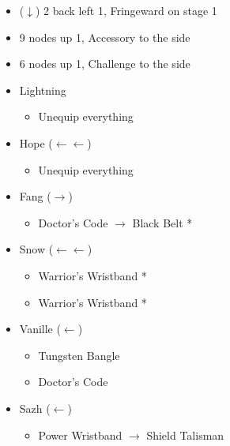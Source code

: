 \begin{menu}
\begin{itemize}
\begin{itemize}
\begin{itemize}
\begin{itemize}
						            \item ($\downarrow$) 2 back left 1, Fringeward on stage 1
						            \item 9 nodes up 1, Accessory to the side
						            \item 6 nodes up 1, Challenge to the side
					            \end{itemize}
				      \end{itemize}
			\end{itemize}
			\equip
			\begin{itemize}
				\item Lightning
				      \begin{itemize}
					      \item Unequip everything
				      \end{itemize}
				\item Hope ($\leftarrow\leftarrow$)
				      \begin{itemize}
					      \item Unequip everything
				      \end{itemize}
				\item Fang ($\rightarrow$)
					            \begin{itemize}
						            \item Doctor's Code $\rightarrow$ Black Belt *
					            \end{itemize}
				\item Snow ($\leftarrow\leftarrow$)
				      \begin{itemize}
						            \item Warrior's Wristband *
						            \item Warrior's Wristband *
					            \end{itemize}
				\item Vanille ($\leftarrow$)
				      \begin{itemize}
						            \item Tungsten Bangle
						            \item Doctor's Code
					            \end{itemize}
				\item Sazh ($\leftarrow$)
				      \begin{itemize}
						            \item Power Wristband $\rightarrow$ Shield Talisman
					            \end{itemize}
			\end{itemize}
		\end{itemize}
\end{menu}
